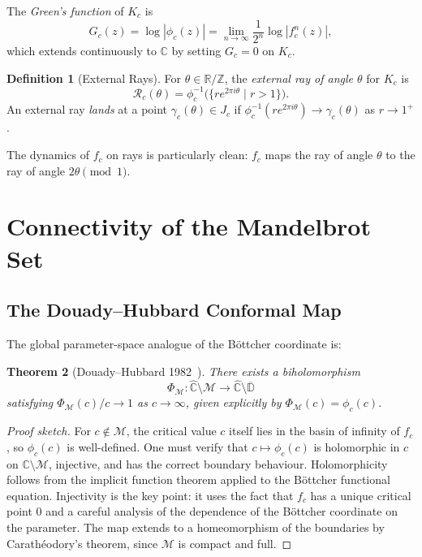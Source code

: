 \documentclass[12pt,a4paper]{amsart}
\newtheorem{theorem}{Theorem}[section]
\theoremstyle{definition}
\newtheorem{definition}[theorem]{Definition}
\theoremstyle{remark}
\begin{document}
The \emph{Green's function} of $K_c$ is
\[
    G_c(z) = \log|\phi_c(z)| = \lim_{n\to\infty} \frac{1}{2^n} \log|f_c^n(z)|,
\]
which extends continuously to $\mathbb{C}$ by setting $G_c = 0$ on $K_c$.

\begin{definition}[External Rays]
For $\theta \in \mathbb{R}/\mathbb{Z}$, the \emph{external ray of angle
$\theta$} for $K_c$ is
\[
    \mathcal{R}_c(\theta) = \phi_c^{-1}\bigl(\{ r e^{2\pi i \theta} \mid r > 1 \}\bigr).
\]
An external ray \emph{lands} at a point $\gamma_c(\theta) \in J_c$ if
$\phi_c^{-1}(r e^{2\pi i \theta}) \to \gamma_c(\theta)$ as $r \to 1^+$.
\end{definition}

The dynamics of $f_c$ on rays is particularly clean: $f_c$ maps the ray of
angle $\theta$ to the ray of angle $2\theta \pmod 1$.

\section{Connectivity of the Mandelbrot Set}

\subsection{The Douady--Hubbard Conformal Map}

The global parameter-space analogue of the Böttcher coordinate is:

\begin{theorem}[Douady--Hubbard 1982~\cite{DouadyHubbard1982}]
\label{thm:DH-connected}
There exists a biholomorphism
\[
    \Phi_{\mathcal{M}} \colon \widehat{\mathbb{C}} \setminus \mathcal{M}
    \longrightarrow \widehat{\mathbb{C}} \setminus \overline{\mathbb{D}}
\]
satisfying $\Phi_{\mathcal{M}}(c)/c \to 1$ as $c \to \infty$, given
explicitly by $\Phi_{\mathcal{M}}(c) = \phi_c(c)$.
\end{theorem}

\begin{proof}[Proof sketch]
For $c \notin \mathcal{M}$, the critical value $c$ itself lies in the
basin of infinity of $f_c$, so $\phi_c(c)$ is well-defined. One must
verify that $c \mapsto \phi_c(c)$ is holomorphic in $c$ on
$\mathbb{C} \setminus \mathcal{M}$, injective, and has the correct
boundary behaviour. Holomorphicity follows from the implicit function
theorem applied to the Böttcher functional equation. Injectivity is the
key point: it uses the fact that $f_c$ has a unique critical point $0$
and a careful analysis of the dependence of the Böttcher coordinate on
the parameter. The map extends to a homeomorphism of the boundaries by
Carathéodory's theorem, since $\mathcal{M}$ is compact and full.
\end{proof}
\end{document}
